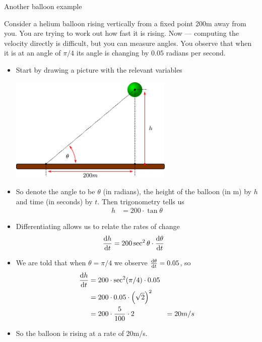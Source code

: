 Another balloon example
\begin{eg}
Consider a helium balloon rising vertically from a fixed point 200m away from
you. You are trying to work out how fast it is rising. Now --- computing the
velocity directly is difficult, but you can measure angles. You observe that
when it is at an angle of $\pi/4$ its angle is changing by $0.05$ radians per
second.

\begin{itemize}
 \item Start by drawing a picture with the relevant variables
\begin{efig}
\begin{center}
 \includegraphics[height=5cm]{extra/balloon1}
\end{center}
\end{efig}
\item So denote the angle to be $\theta$ (in radians), the height of the balloon (in m)
by $h$ and time (in seconds) by $t$. Then trigonometry tells us
\begin{align*}
  h &= 200 \cdot \tan \theta
\end{align*}
\item Differentiating allows us to relate the rates of change
\begin{align*}
  \diff{h}{t} &= 200 \sec^2 \theta \cdot \diff{\theta}{t}
\end{align*}
\item We are told that when $\theta =\pi/4$ we observe $\diff{\theta}{t} =
0.05$, so
\begin{align*}
  \diff{h}{t} &= 200 \cdot \sec^2(\pi/4) \cdot 0.05 \\
  &= 200 \cdot 0.05 \cdot \left( \sqrt{2} \right)^2 \\
  &= 200 \cdot \frac{5}{100} \cdot 2
  &= 20 m/s
\end{align*}
\item So the balloon is rising at a rate of 20m/s.
\end{itemize}

\end{eg}


